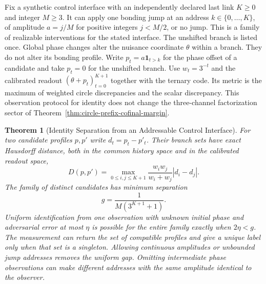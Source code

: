 \documentclass[11pt,a4paper]{article}
\newtheorem{theorem}{Theorem}[section]
\theoremstyle{definition}
\begin{document}
Fix a synthetic control interface with an independently declared last link $K\ge0$ and integer $M\ge3$. It can apply one bonding jump at an address $k\in\{0,\ldots,K\}$, of amplitude $a=j/M$ for positive integers $j<M/2$, or no jump. This is a family of realizable interventions for the stated interface. The unshifted branch is listed once. Global phase changes alter the nuisance coordinate $\theta$ within a branch. They do not alter its bonding profile. Write $p_t=a\mathbf1_{t>k}$ for the phase offset of a candidate and take $p_t=0$ for the unshifted branch. Use $w_t=3^{-t}$ and the calibrated readout $(\theta+p_t)_{t=0}^{K+1}$ together with the ternary code. Its metric is the maximum of weighted circle discrepancies and the scalar discrepancy. This observation protocol for identity does not change the three-channel factorization sector of Theorem~\ref{thm:circle-prefix-cofinal-margin}.

\begin{theorem}[Identity Separation from an Addressable Control Interface]\label{thm:addressable-identity-alternatives}
For two candidate profiles $p,p'$ write $d_t=p_t-p'_t$. Their branch sets have exact Hausdorff distance, both in the common history space and in the calibrated readout space,
\[
 D(p,p')=\max_{0\le i,j\le K+1}
 \frac{w_iw_j}{w_i+w_j}|d_i-d_j|.
\]
The family of distinct candidates has minimum separation
\[
 g=\frac{1}{M(3^{K+1}+1)}.
\]
Uniform identification from one observation with unknown initial phase and adversarial error at most $\eta$ is possible for the entire family exactly when $2\eta<g$. The measurement can return the set of compatible profiles and give a unique label only when that set is a singleton. Allowing continuous amplitudes or unbounded jump addresses removes the uniform gap. Omitting intermediate phase observations can make different addresses with the same amplitude identical to the observer.
\end{theorem}
\end{document}
